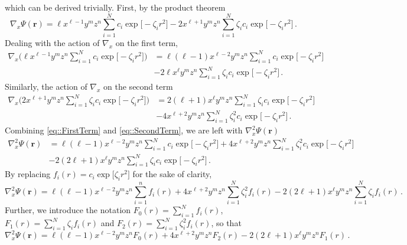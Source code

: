 %
which can be derived trivially. First, by the product theorem
%
\begin{equation}
	\nabla_x \Psi(\mathbf{r}) = \ell x^{\ell-1} y^m z^n \sum_{i=1}^N c_i \exp \Big[ -\zeta_i r^2 \Big] - 2x^{\ell+1}y^m z^n \sum_{i=1}^N \zeta_i c_i \exp \Big[ -\zeta_i r^2 \Big] \,.
\end{equation}
%
Dealing with the action of $\nabla_x$ on the first term,
%
\begin{align}\label{eq::FirstTerm}
	\nabla_x \Big(  \ell x^{\ell-1} y^m z^n \sum_{i=1}^N c_i \exp \Big[ -\zeta_i r^2 \Big] \Big) &= \ell(\ell-1)x^{\ell-2} y^m z^n \sum_{i=1}^N c_i \exp \Big[ -\zeta_i r^2 \Big] \nonumber \\
    &- 2 \ell x^\ell y^m z^n \sum_{i=1}^N \zeta_i c_i \exp \Big[ -\zeta_i r^2 \Big] \,.
\end{align}
%
Similarly, the action of $\nabla_x$ on the second term
%
\begin{align}\label{eq::SecondTerm}
	\nabla_x \Big( 2x^{\ell+1} y^m z^n \sum_{i=1}^N \zeta_i c_i \exp \Big[ -\zeta_i r^2 \Big] \Big) &= 2(\ell+1)x^\ell y^m z^n \sum_{i=1}^N \zeta_i c_i \exp \Big[ -\zeta_i r^2 \Big] \nonumber \\
    &- 4x^{\ell+2} y^m z^n \sum_{i=1}^N \zeta_i^2 c_i \exp \Big[ -\zeta_i r^2 \Big] \,.
\end{align}
%
Combining \eqref{eq::FirstTerm} and \eqref{eq::SecondTerm}, we are left with $\nabla^2_x \Psi(\mathbf{r})$
%
\begin{align}
	\nabla^2_x \Psi(\mathbf{r}) &= \ell(\ell-1)x^{\ell-2} y^m z^n \sum_{i=1}^N c_i \exp \Big[ -\zeta_i r^2 \Big] +  4x^{\ell+2} y^m z^n \sum_{i=1}^N \zeta_i^2 c_i \exp \Big[ -\zeta_i r^2 \Big] \\ 
    &- 2(2\ell+1)x^\ell y^m z^n \sum_{i=1}^N \zeta_i c_i \exp \Big[ -\zeta_i r^2 \Big] \,.
\end{align}
%
By replacing $ f_i(r) = c_i \exp\Big[ \zeta_i r^2 \Big]$ for the sake of clarity,
%
\begin{equation}
    \nabla^2_x \Psi(\mathbf{r})= \ell(\ell-1)x^{\ell-2} y^m z^n \sum_{i=1}^n f_i(r) + 4x^{\ell+2} y^m z^n \sum_{i=1}^N \zeta_i^2 f_i(r) - 2(2\ell+1)x^\ell y^m z^n \sum_{i=1}^N \zeta_i f_i(r) \,.
\end{equation}
%
Further, we introduce the notation $F_0(r) = \sum_{i=1}^N f_i(r)$, $F_1(r) = \sum_{i=1}^N \zeta_i f_i(r)$ 
and $F_2(r) = \sum_{i=1}^N \zeta_i^2 f_i(r)$, so that
%
\begin{equation}
    \nabla^2_x \Psi(\mathbf{r})= \ell(\ell-1)x^{\ell-2} y^m z^n F_0(r) + 4x^{\ell+2} y^m z^n F_2(r) - 2(2\ell+1)x^\ell y^m z^n F_1(r) \,.
\end{equation}
